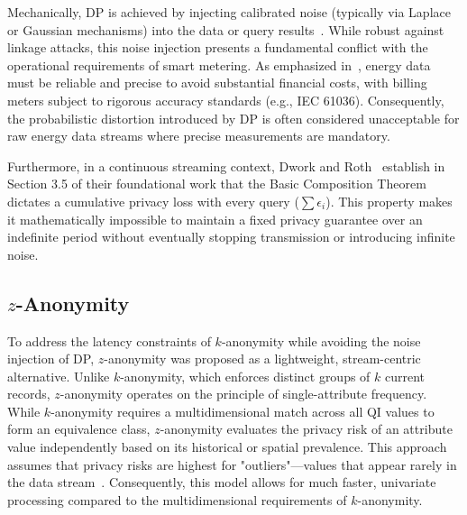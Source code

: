 Mechanically, DP is achieved by injecting calibrated noise (typically via Laplace or Gaussian mechanisms) into the data or query results~\cite{DifferentialPrivacy}. While robust against linkage attacks, this noise injection presents a fundamental conflict with the operational requirements of smart metering. As emphasized in~\cite{DemandResponseSurvey}, energy data must be reliable and precise to avoid substantial financial costs, with billing meters subject to rigorous accuracy standards (e.g., IEC 61036). Consequently, the probabilistic distortion introduced by DP is often considered unacceptable for raw energy data streams where precise measurements are mandatory.

Furthermore, in a continuous streaming context, Dwork and Roth~\cite{DifferentialPrivacy} establish in Section 3.5 of their foundational work that the Basic Composition Theorem dictates a cumulative privacy loss with every query ($\sum \epsilon_i$). This property makes it mathematically impossible to maintain a fixed privacy guarantee over an indefinite period without eventually stopping transmission or introducing infinite noise.



\subsection{\texorpdfstring{$z$}{z}-Anonymity}
To address the latency constraints of $k$-anonymity while avoiding the noise injection of DP, $z$-anonymity was proposed as a lightweight, stream-centric alternative. Unlike $k$-anonymity, which enforces distinct groups of $k$ current records, $z$-anonymity operates on the principle of single-attribute frequency. While $k$-anonymity requires a multidimensional match across all \ac{QI} values to form an equivalence class, $z$-anonymity evaluates the privacy risk of an attribute value independently based on its historical or spatial prevalence. This approach assumes that privacy risks are highest for "outliers"—values that appear rarely in the data stream~\cite{zanonDataStreams}. Consequently, this model allows for much faster, univariate processing compared to the multidimensional requirements of $k$-anonymity.

